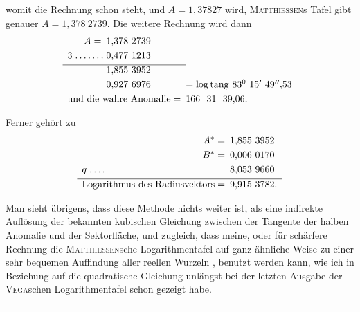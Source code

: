 womit die Rechnung schon steht, und \(A=1{,}37827\) wird, \textsc{Matthiessen}s Tafel gibt genauer \(A=1{,}378\ 2739.\) Die weitere Rechnung wird dann
\[
\begin{array}{r@{\;}l@{\;}l@{\quad}l}
\multicolumn{2}{r}{A=}&1{,}378\ 2739&\\[3pt]
3&.\,.\,.\,.\,.\,.\,.&0{,}477\ 1213&\\[3pt]\cline{1-3}
&&1{,}855\ 3952&\\[3pt]
&&0{,}927\ 6976&=\log\mathrm{tang}\ 83^0\ 15'\ 49''{,}53\\[3pt]
\multicolumn{3}{r}{\text{und die wahre Anomalie}=}&166\ \ 31\ \ 39{,}06.
\end{array}
\]
\par
\noindent\hspace*{\parindent}Ferner gehört zu
\[
\begin{array}{r@{\;}l@{\;}l}
\multicolumn{2}{r}{A^*=}&1{,}855\ 3952\\[3pt]
\multicolumn{2}{r}{B^*=}&0{,}006\ 0170\\[3pt]
q&.\,.\,.\,.&8{,}053\ 9660\\[3pt]\hline
\multicolumn{2}{r}{\text{Logarithmus des Radiusvektors}=}&9{,}915\ 3782.
\end{array}
\]
\par
\noindent\hspace*{\parindent}Man sieht übrigens, dass diese Methode nichts weiter ist, als eine indirekte Auflösung der bekannten kubischen Gleichung zwischen der Tangente der halben Anomalie und der Sektorfläche, und zugleich, dass meine, oder für schärfere Rechnung die \textsc{Matthiessen}sche Logarithmentafel auf ganz ähnliche Weise zu einer sehr bequemen Auffindung aller reellen Wurzeln , benutzt werden kann, wie ich in Beziehung auf die quadratische Gleichung unlängst bei der letzten Ausgabe der \textsc{Vega}schen Logarithmentafel schon gezeigt habe.
\par\medskip
\begin{center}\rule{.2\linewidth}{.4pt}\end{center}
